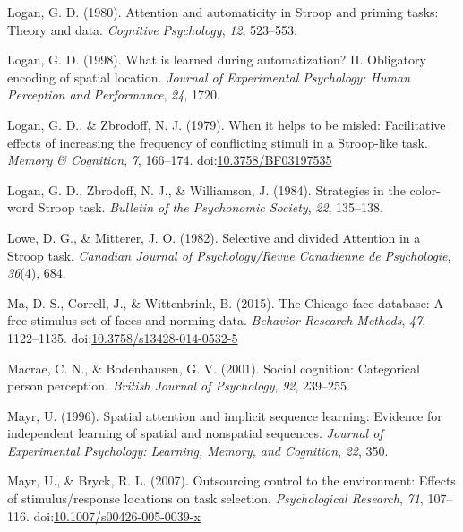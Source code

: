 \documentclass[english,,man,floatsintext]{apa6}
\begin{document}
\leavevmode\hypertarget{ref-logan_attention_1980}{}%
Logan, G. D. (1980). Attention and automaticity in Stroop and priming tasks: Theory and data. \emph{Cognitive Psychology}, \emph{12}, 523--553.

\leavevmode\hypertarget{ref-logan_what_1998}{}%
Logan, G. D. (1998). What is learned during automatization? II. Obligatory encoding of spatial location. \emph{Journal of Experimental Psychology: Human Perception and Performance}, \emph{24}, 1720.

\leavevmode\hypertarget{ref-logan_when_1979}{}%
Logan, G. D., \& Zbrodoff, N. J. (1979). When it helps to be misled: Facilitative effects of increasing the frequency of conflicting stimuli in a Stroop-like task. \emph{Memory \& Cognition}, \emph{7}, 166--174. doi:\href{https://doi.org/10.3758/BF03197535}{10.3758/BF03197535}

\leavevmode\hypertarget{ref-logan_strategies_1984}{}%
Logan, G. D., Zbrodoff, N. J., \& Williamson, J. (1984). Strategies in the color-word Stroop task. \emph{Bulletin of the Psychonomic Society}, \emph{22}, 135--138.

\leavevmode\hypertarget{ref-lowe_selective_1982}{}%
Lowe, D. G., \& Mitterer, J. O. (1982). Selective and divided Attention in a Stroop task. \emph{Canadian Journal of Psychology/Revue Canadienne de Psychologie}, \emph{36}(4), 684.

\leavevmode\hypertarget{ref-ma_chicago_2015}{}%
Ma, D. S., Correll, J., \& Wittenbrink, B. (2015). The Chicago face database: A free stimulus set of faces and norming data. \emph{Behavior Research Methods}, \emph{47}, 1122--1135. doi:\href{https://doi.org/10.3758/s13428-014-0532-5}{10.3758/s13428-014-0532-5}

\leavevmode\hypertarget{ref-macrae_social_2001}{}%
Macrae, C. N., \& Bodenhausen, G. V. (2001). Social cognition: Categorical person perception. \emph{British Journal of Psychology}, \emph{92}, 239--255.

\leavevmode\hypertarget{ref-mayr_spatial_1996}{}%
Mayr, U. (1996). Spatial attention and implicit sequence learning: Evidence for independent learning of spatial and nonspatial sequences. \emph{Journal of Experimental Psychology: Learning, Memory, and Cognition}, \emph{22}, 350.

\leavevmode\hypertarget{ref-mayr_outsourcing_2007}{}%
Mayr, U., \& Bryck, R. L. (2007). Outsourcing control to the environment: Effects of stimulus/response locations on task selection. \emph{Psychological Research}, \emph{71}, 107--116. doi:\href{https://doi.org/10.1007/s00426-005-0039-x}{10.1007/s00426-005-0039-x}
\end{document}
